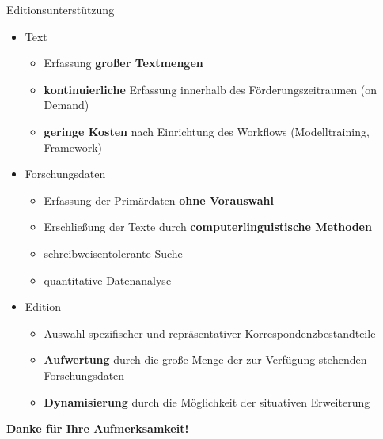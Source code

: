 \documentclass{bbawslides}
\begin{document}
\begin{bbawslide}{Editionsunterstützung}
  \vspace*{1mm}%
  \centerslidestrue%
  \begin{itemize}
    \item Text
    \begin{itemize}\small
      \item Erfassung \textbf{großer Textmengen}
      \item \textbf{kontinuierliche} Erfassung innerhalb des Förderungszeitraumen (on Demand)
      \item \textbf{geringe Kosten} nach Einrichtung des Workflows (Modelltraining, Framework)
    \end{itemize}
    \item Forschungsdaten
    \begin{itemize}\small
      \item Erfassung der Primärdaten \textbf{ohne Vorauswahl}
      \item Erschließung der Texte durch \textbf{computerlinguistische Methoden} 
      \item schreibweisentolerante Suche
      \item quantitative Datenanalyse
    \end{itemize}
    \item Edition
    \begin{itemize}\small
      \item Auswahl spezifischer und repräsentativer Korrespondenzbestandteile
      \item \textbf{Aufwertung} durch die große Menge der zur Verfügung stehenden Forschungsdaten
      \item \textbf{Dynamisierung} durch die Möglichkeit der situativen Erweiterung 
    \end{itemize}
  \end{itemize}
\end{bbawslide}

\begin{bbawpart}{\Large\bf Danke für Ihre Aufmerksamkeit!\\}
\end{bbawpart}
\end{document}
